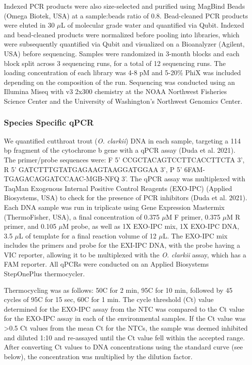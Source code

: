\documentclass[
]{article}
\begin{document}
Indexed PCR products were also size-selected and purified using MagBind
Beads (Omega Biotek, USA) at a sample:beads ratio of 0.8. Bead-cleaned
PCR products were eluted in 30 \(\mu\)L of molecular grade water and
quantified via Qubit. Indexed and bead-cleaned products were normalized
before pooling into libraries, which were subsequently quantified via
Qubit and visualized on a Bioanalyzer (Agilent, USA) before sequencing.
Samples were randomized in 3-month blocks and each block split across 3
sequencing runs, for a total of 12 sequencing runs. The loading
concentration of each library was 4-8 pM and 5-20\% PhiX was included
depending on the composition of the run. Sequencing was conducted using
an Illumina Miseq with v3 2x300 chemistry at the NOAA Northwest
Fisheries Science Center and the University of Washington's Northwest
Genomics Center.

\hypertarget{species-specific-qpcr}{%
\subsubsection{Species Specific qPCR}\label{species-specific-qpcr}}

We quantified cutthroat trout (\emph{O. clarkii}) DNA in each sample,
targeting a 114 bp fragment of the cytochrome b gene with a qPCR assay
(Duda et al. 2021). The primer/probe sequences were: F 5'
CCGCTACAGTCCTTCACCTTCTA 3', R 5' GATCTTTGTATGAGAAGTAAGGATGGAA 3', P 5'
6FAM-TGAGACAGGATCCAAC-MGB-NFQ 3'. The qPCR assay was multiplexed with
TaqMan Exogenous Internal Positive Control Reagents (EXO-IPC) (Applied
Biosystems, USA) to check for the presence of PCR inhibitors (Duda et
al. 2021). Each DNA sample was run in triplicate using Gene Expression
Mastermix (ThermoFisher, USA), a final concentration of 0.375 \(\mu\)M F
primer, 0.375 \(\mu\)M R primer, and 0.105 \(\mu\)M probe, as well as 1X
EXO-IPC mix, 1X EXO-IPC DNA, 3.5 \(\mu\)L of template for a final
reaction volume of 12 \(\mu\)L. The EXO-IPC mix includes the primers and
probe for the EXI-IPC DNA, with the probe having a VIC reporter,
allowing it to be multiplexed with the \emph{O. clarkii} assay, which
has a FAM reporter. All qPCRs were conducted on an Applied Biosystems
StepOnePlus thermocycler.

Thermocycling was as follows: 50\degree C for 2 min, 95\degree C for 10
min, followed by 45 cycles of 95\degree C for 15 sec, 60\degree C for 1
min. The cycle threshold (Ct) value determined for the EXO-IPC assay
from the NTC was compared to the Ct value for the EXO-IPC assay in each
of the environmental samples. If the Ct value was \textgreater0.5 Ct
values from the mean Ct for the NTCs, the sample was deemed inhibited
and diluted 1:10 and re-assayed until the Ct value fell within the
accepted range. After converting Ct values to DNA concentrations using
the standard curve (see below), the concentration was multiplied by the
dilution factor.
\end{document}
